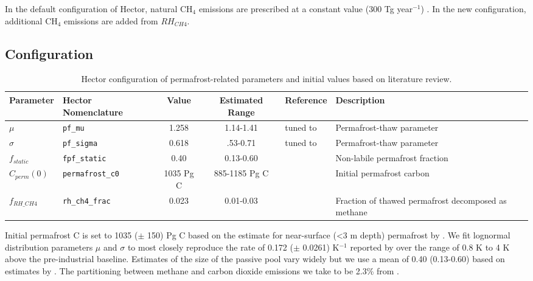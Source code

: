 \documentclass[essd, manuscript]{copernicus}
\begin{document}
In the default configuration of Hector, natural CH$_4$ emissions are prescribed at a constant value (300 Tg year$^{-1}$) \citep{hartin_2015_simple}.
In the new configuration, additional CH$_4$ emissions are added from $RH_{CH4}$.

\subsection{Configuration}
\begin{table}[ht!]
\centering
\caption{Hector configuration of permafrost-related parameters and initial values based on literature review.}
 \begin{tabularx}{\textwidth}{l l c c p{1.25in} p{1.75in}} 
 \hline\noalign{\medskip}
Parameter & Hector Nomenclature & Value & Estimated Range & Reference & Description\\ [1ex]
 \hline\noalign{\medskip}
 $\mu$ & \texttt{pf\_mu} & 1.258 & 1.14-1.41 & tuned to \citet{kessler_2017_estimating} & Permafrost-thaw parameter \\ 
$\sigma$ & \texttt{pf\_sigma} & 0.618 & .53-0.71 & tuned to \citet{kessler_2017_estimating} & Permafrost-thaw parameter \\
 $f_{static}$ & \texttt{fpf\_static} & 0.40 & 0.13-0.60 & \citet{burke_2012_uncertainties, burke_2013_estimating} & Non-labile permafrost fraction \\ 
 $C_{perm}(0)$ & \texttt{permafrost\_c0} & 1035 Pg C & 885-1185 Pg C & \citet{hugelius_2014_estimated} & Initial permafrost carbon\\
  $f_{RH\_CH4}$ & \texttt{rh\_ch4\_frac} & 0.023 & 0.01-0.03 & \citet{kessler_2017_estimating} & Fraction of thawed permafrost \mbox{decomposed} as methane \\[1ex] 
 \hline
 \end{tabularx}
 \label{table:config}
\end{table}
Initial permafrost C is set to 1035 ($\pm$ 150) Pg C based on the estimate for near-surface (<3 m depth) permafrost by \citet{hugelius_2014_estimated}. We fit lognormal distribution parameters $\mu$ and $\sigma$ to most closely reproduce the rate of 0.172 ($\pm$ 0.0261) K$^{-1}$ reported by \citet{kessler_2017_estimating} over the range of 0.8 K \footnotemark to 4 K above the pre-industrial baseline. Estimates of the size of the passive pool vary widely but we use a mean of 0.40 (0.13-0.60) based on estimates by \citet{burke_2012_uncertainties, burke_2013_estimating}. The partitioning between methane and carbon dioxide emissions we take to be 2.3\% from \citet{kessler_2017_estimating}.
\end{document}
